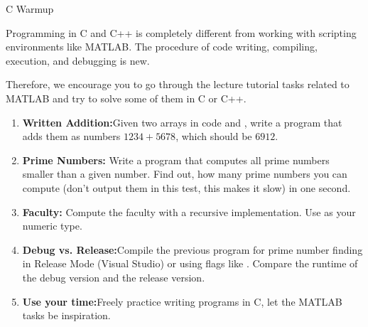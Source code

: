 \begin{task}{C Warmup}{}{}

  Programming in C and C++ is completely different from working with scripting environments like MATLAB.
  The procedure of code writing, compiling, execution, and debugging is new.

  Therefore, we encourage you to go through the lecture tutorial tasks related to MATLAB and try to
  solve some of them in C or C++. 

  \begin{enumerate}
  \item{\textbf{Written Addition:}Given two arrays in code  and , write a program that adds them as numbers $1234 + 5678$, which should be $6912$.}
  \item{\textbf{Prime Numbers:} Write a program that computes all prime numbers smaller than a given number. Find out, how many prime numbers you can compute (don't output them in this test, this makes it slow) in one second.}
   \item{\textbf{Faculty:} Compute the faculty with a recursive implementation. Use  as your numeric type. }
  \item{\textbf{Debug vs. Release\up{+}:}Compile the previous program for prime number finding in Release Mode (Visual Studio) or using
    flags like . Compare the runtime of the debug version and the release version.
  }
    \item{\textbf{Use your time\up{*}:}Freely practice writing programs in C, let the MATLAB tasks be inspiration.}
  \end{enumerate}
%

  
  
\end{task}
